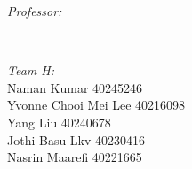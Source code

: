 \begin{titlepage}
\begin{minipage}{0.5\textwidth}
\begin{flushleft} \large
\emph{Professor:}\\
\@author %
\end{flushleft}
\end{minipage}
~
\begin{minipage}{0.4\textwidth}
\emph{Team H:} \\[1.2em] %
Naman Kumar 40245246\\
Yvonne Chooi Mei Lee 40216098\\ 
Yang Liu 40240678\\
Jothi Basu Lkv 40230416\\
Nasrin Maarefi 40221665\\[1.2em]

\end{minipage}\\[3cm]
\makeatother

\vfill %

\end{titlepage}